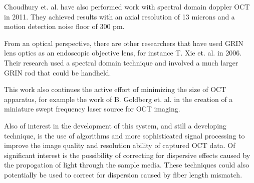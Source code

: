 Choudhury et. al. have also performed work with spectral domain doppler OCT in 2011. They achieved results with an axial resolution of 13 microns and a motion detection noise floor of 300 pm. \cite{Choudhury2011} %

From an optical perspective, there are other researchers that have used GRIN lens optics as an endoscopic objective lens, for instance T. Xie et. al. in 2006. \cite{Xie2006} Their research used a spectral domain technique and involved a much larger GRIN rod that could be handheld.

This work also continues the active effort of minimizing the size of OCT apparatus, for example the work of B. Goldberg et. al. in the creation of a miniature swept frequency laser source for OCT imaging. \cite{Goldberg2009}

Also of interest in the development of this system, and still a developing technique, is the use of algorithms and more sophisticated signal processing to improve the image quality and resolution ability of captured OCT data. Of significant interest is the possibility of correcting for dispersive effects caused by the propogation of light through the sample media. \cite{Xie2005} \cite{DrexlerBook} These techniques could also potentially be used to correct for dispersion caused by fiber length mismatch.
